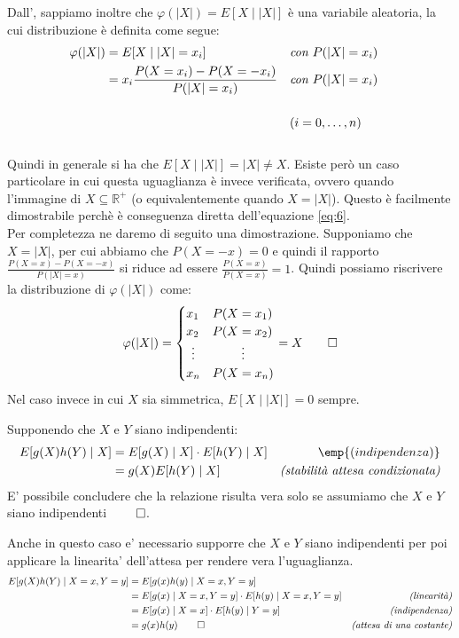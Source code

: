 \documentclass{homework}
\begin{document}
Dall', sappiamo inoltre che $\varphi(|X|) = E[X \mid |X|]$ è una variabile aleatoria, la cui distribuzione è definita come segue:
\[
\begin{align}
    \varphi(|X|) &= E[X \mid |X| = x_i]  && \emph{con } P(|X| = x_i)&&\\
               &= x_i \frac{P(X = x_i) - P(X = -x_i)}{P(|X| = x_i)} && \emph{con } P(|X| = x_i)&&\\[3ex]
               & &&(i = 0, \dots, n)\\[3ex]
\end{align}
\]
Quindi in generale si ha che $E[X \mid |X|] = |X| \neq X$.
Esiste però un caso particolare in cui questa uguaglianza è invece verificata, ovvero quando l'immagine di $X \subseteq \mathbb{R^+}$ (o equivalentemente quando $X = |X|$). Questo è facilmente dimostrabile perchè è conseguenza diretta dell'equazione \ref{eq:6}. \\
Per completezza ne daremo di seguito una dimostrazione. Supponiamo che $X = |X|$, per cui abbiamo che $P(X=-x) = 0$ e quindi il rapporto $\frac {P(X=x)-P(X=-x)}{P(|X| = x)}$ si riduce ad essere $\frac {P(X=x)}{P(X=x)} = 1$.
Quindi possiamo riscrivere la distribuzione di $\varphi(|X|)$ come:
\[
\varphi(|X|) = \begin{cases}
    x_1 & P(X=x_1) \\
    x_2 & P(X=x_2)\\
    \hfil \vdots & \hfil \vdots\\
    x_n & P(X=x_n) \\
    \end{cases} = X \qed
\]
Nel caso invece in cui $X$ sia simmetrica, $E[X \mid |X|] = 0$ sempre. 

\exercise*[3.d]
Supponendo che $X$ e $Y$ siano indipendenti:
\[
\begin{align}
    E[g(X)h(Y)\mid X] &= E[g(X)\mid X] \cdot E[h(Y)\mid X] & \emp{(indipendenza)}\\
                      &= g(X) E[h(Y) \mid X] & \emph{(stabilità attesa condizionata)}   
\end{align}
\]
E' possibile concludere che la relazione risulta vera solo se assumiamo che $X$ e $Y$ siano indipendenti $\qed$.

\exercise*[3.e]
Anche in questo caso e' necessario supporre che $X$ e $Y$ siano indipendenti per poi applicare la linearita' 
dell'attesa per rendere vera l'uguaglianza. 
\[
\begin{align}
E[g(X)h(Y)\mid X=x, Y=y] &= E[g(x)h(y) \mid X=x, Y=y]& \\
                         &= E[g(x) \mid X = x, Y = y] \cdot E[h(y) \mid X = x, Y = y] & \emph{(linearità)}\\
                         &= E[g(x) \mid X = x] \cdot E[h(y) \mid Y = y]&\emph{(indipendenza)}\\
                         &= g(x)h(y) \qed & \emph{(attesa di una costante)}\\
\end{align}
\]
\end{document}
